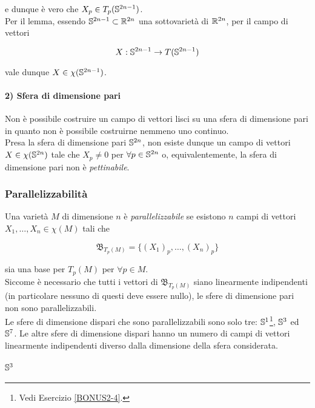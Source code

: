 e dunque è vero che $ X_{p} \in T_{p}(\S^{2n-1}) $.\\
Per il lemma, essendo $ \S^{2n-1} \subset \R^{2n} $ una sottovarietà di $ \R^{2n} $, per il campo di vettori

\begin{equation}
	X : \S^{2n-1} \to T(\S^{2n-1})
\end{equation}

vale dunque $ X \in \chi(\S^{2n-1}) $.

\paragraph{2) Sfera di dimensione pari}

Non è possibile costruire un campo di vettori lisci su una sfera di dimensione pari in quanto non è possibile costruirne nemmeno uno continuo.\\
Presa la sfera di dimensione pari $ \S^{2n} $, non esiste dunque un campo di vettori $ X \in \chi(\S^{2n}) $ tale che $ X_{p} \neq 0 $ per $ \forall p \in \S^{2n} $ o, equivalentemente, la sfera di dimensione pari non è \textit{pettinabile}.

\subsubsection{Parallelizzabilità}

Una varietà $ M $ di dimensione $ n $ è \textit{parallelizzabile} se esistono $ n $ campi di vettori $ X_{1},\dots,X_{n} \in \chi(M) $ tali che

\begin{equation}
	\mathfrak{B}_{T_{p}(M)} = \{ (X_{1})_{p},\dots,(X_{n})_{p} \}
\end{equation}

sia una base per $ T_{p}(M) $ per $ \forall p \in M $.\\
Siccome è necessario che tutti i vettori di $ \mathfrak{B}_{T_{p}(M)} $ siano linearmente indipendenti (in particolare nessuno di questi deve essere nullo), le sfere di dimensione pari non sono parallelizzabili.\\
Le sfere di dimensione dispari che sono parallelizzabili sono solo tre: $ \S^{1} $\footnote{%
	Vedi Esercizio \ref{BONUS2-4}.%
}, $ \S^{3} $ ed $ \S^{7} $. Le altre sfere di dimensione dispari hanno un numero di campi di vettori linearmente indipendenti diverso dalla dimensione della sfera considerata.

\paragraph{$ \S^{3} $}

